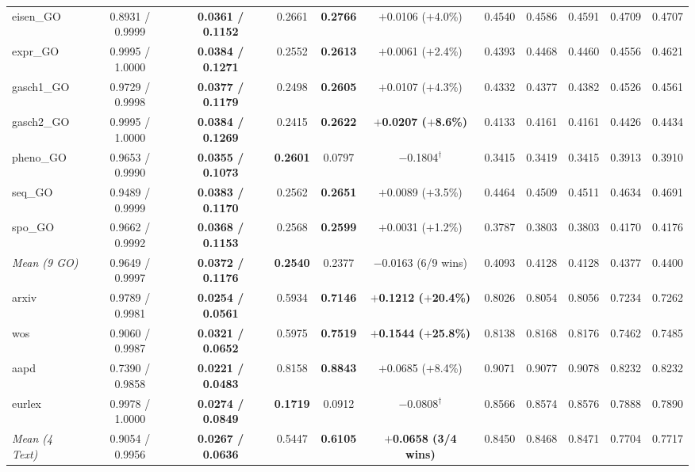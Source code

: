 \documentclass[preprint,12pt]{elsarticle}
\begin{document}
\begin{table}[htbp]
{\begin{tabular}{lcccccccccc}
eisen\_GO         & 0.8931 / 0.9999 & \textbf{0.0361 / 0.1152} & 0.2661 & \textbf{0.2766} & $+$0.0106 ($+$4.0\%) & 0.4540 & 0.4586 & 0.4591 & 0.4709 & 0.4707 \\
expr\_GO          & 0.9995 / 1.0000 & \textbf{0.0384 / 0.1271} & 0.2552 & \textbf{0.2613} & $+$0.0061 ($+$2.4\%) & 0.4393 & 0.4468 & 0.4460 & 0.4556 & 0.4621 \\
gasch1\_GO        & 0.9729 / 0.9998 & \textbf{0.0377 / 0.1179} & 0.2498 & \textbf{0.2605} & $+$0.0107 ($+$4.3\%) & 0.4332 & 0.4377 & 0.4382 & 0.4526 & 0.4561 \\
gasch2\_GO        & 0.9995 / 1.0000 & \textbf{0.0384 / 0.1269} & 0.2415 & \textbf{0.2622} & \textbf{$+$0.0207 ($+$8.6\%)} & 0.4133 & 0.4161 & 0.4161 & 0.4426 & 0.4434 \\
pheno\_GO         & 0.9653 / 0.9990 & \textbf{0.0355 / 0.1073} & \textbf{0.2601} & 0.0797 & $-$0.1804$^\dagger$ & 0.3415 & 0.3419 & 0.3415 & 0.3913 & 0.3910 \\
seq\_GO           & 0.9489 / 0.9999 & \textbf{0.0383 / 0.1170} & 0.2562 & \textbf{0.2651} & $+$0.0089 ($+$3.5\%) & 0.4464 & 0.4509 & 0.4511 & 0.4634 & 0.4691 \\
spo\_GO           & 0.9662 / 0.9992 & \textbf{0.0368 / 0.1153} & 0.2568 & \textbf{0.2599} & $+$0.0031 ($+$1.2\%) & 0.3787 & 0.3803 & 0.3803 & 0.4170 & 0.4176 \\
\midrule
\textit{Mean (9 GO)} & 0.9649 / 0.9997 & \textbf{0.0372 / 0.1176} & \textbf{0.2540} & 0.2377 & $-$0.0163 (6/9 wins) & 0.4093 & 0.4128 & 0.4128 & 0.4377 & 0.4400 \\
\midrule
arxiv             & 0.9789 / 0.9981 & \textbf{0.0254 / 0.0561} & 0.5934 & \textbf{0.7146} & \textbf{$+$0.1212 ($+$20.4\%)} & 0.8026 & 0.8054 & 0.8056 & 0.7234 & 0.7262 \\
wos               & 0.9060 / 0.9987 & \textbf{0.0321 / 0.0652} & 0.5975 & \textbf{0.7519} & \textbf{$+$0.1544 ($+$25.8\%)} & 0.8138 & 0.8168 & 0.8176 & 0.7462 & 0.7485 \\
aapd              & 0.7390 / 0.9858 & \textbf{0.0221 / 0.0483} & 0.8158 & \textbf{0.8843} & $+$0.0685 ($+$8.4\%) & 0.9071 & 0.9077 & 0.9078 & 0.8232 & 0.8232 \\
eurlex            & 0.9978 / 1.0000 & \textbf{0.0274 / 0.0849} & \textbf{0.1719} & 0.0912 & $-$0.0808$^\dagger$ & 0.8566 & 0.8574 & 0.8576 & 0.7888 & 0.7890 \\
\midrule
\textit{Mean (4 Text)} & 0.9054 / 0.9956 & \textbf{0.0267 / 0.0636} & 0.5447 & \textbf{0.6105} & \textbf{$+$0.0658 (3/4 wins)} & 0.8450 & 0.8468 & 0.8471 & 0.7704 & 0.7717 \\

\end{tabular}}
\end{table}
\end{document}
